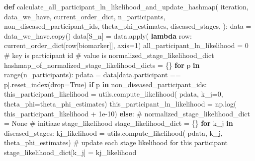 \documentclass[
  letterpaper,
  DIV=11,
  numbers=noendperiod]{scrreprt}
\newenvironment{Shaded}{\begin{snugshade}}{\end{snugshade}}
\newcommand{\BuiltInTok}[1]{\textcolor[rgb]{0.00,0.23,0.31}{#1}}
\newcommand{\CommentTok}[1]{\textcolor[rgb]{0.37,0.37,0.37}{#1}}
\newcommand{\ControlFlowTok}[1]{\textcolor[rgb]{0.00,0.23,0.31}{\textbf{#1}}}
\newcommand{\DecValTok}[1]{\textcolor[rgb]{0.68,0.00,0.00}{#1}}
\newcommand{\FloatTok}[1]{\textcolor[rgb]{0.68,0.00,0.00}{#1}}
\newcommand{\KeywordTok}[1]{\textcolor[rgb]{0.00,0.23,0.31}{\textbf{#1}}}
\newcommand{\NormalTok}[1]{\textcolor[rgb]{0.00,0.23,0.31}{#1}}
\newcommand{\OperatorTok}[1]{\textcolor[rgb]{0.37,0.37,0.37}{#1}}
\newcommand{\StringTok}[1]{\textcolor[rgb]{0.13,0.47,0.30}{#1}}
\newcommand{\VariableTok}[1]{\textcolor[rgb]{0.07,0.07,0.07}{#1}}
\begin{document}
\begin{Shaded}
\begin{Highlighting}[]
\KeywordTok{def}\NormalTok{ calculate\_all\_participant\_ln\_likelihood\_and\_update\_hashmap(}
\NormalTok{        iteration,}
\NormalTok{        data\_we\_have,}
\NormalTok{        current\_order\_dict,}
\NormalTok{        n\_participants,}
\NormalTok{        non\_diseased\_participant\_ids,}
\NormalTok{        theta\_phi\_estimates,}
\NormalTok{        diseased\_stages,}
\NormalTok{):}
\NormalTok{    data }\OperatorTok{=}\NormalTok{ data\_we\_have.copy()}
\NormalTok{    data[}\StringTok{\textquotesingle{}S\_n\textquotesingle{}}\NormalTok{] }\OperatorTok{=}\NormalTok{ data.}\BuiltInTok{apply}\NormalTok{(}
        \KeywordTok{lambda}\NormalTok{ row: current\_order\_dict[row[}\StringTok{\textquotesingle{}biomarker\textquotesingle{}}\NormalTok{]], axis}\OperatorTok{=}\DecValTok{1}\NormalTok{)}
\NormalTok{    all\_participant\_ln\_likelihood }\OperatorTok{=} \DecValTok{0}
    \CommentTok{\# key is participant id}
    \CommentTok{\# value is normalized\_stage\_likelihood\_dict}
\NormalTok{    hashmap\_of\_normalized\_stage\_likelihood\_dicts }\OperatorTok{=}\NormalTok{ \{\}}
    \ControlFlowTok{for}\NormalTok{ p }\KeywordTok{in} \BuiltInTok{range}\NormalTok{(n\_participants):}
\NormalTok{        pdata }\OperatorTok{=}\NormalTok{ data[data.participant }\OperatorTok{==}\NormalTok{ p].reset\_index(drop}\OperatorTok{=}\VariableTok{True}\NormalTok{)}
        \ControlFlowTok{if}\NormalTok{ p }\KeywordTok{in}\NormalTok{ non\_diseased\_participant\_ids:}
\NormalTok{            this\_participant\_likelihood }\OperatorTok{=}\NormalTok{ utils.compute\_likelihood(}
\NormalTok{                pdata, k\_j}\OperatorTok{=}\DecValTok{0}\NormalTok{, theta\_phi}\OperatorTok{=}\NormalTok{theta\_phi\_estimates)}
\NormalTok{            this\_participant\_ln\_likelihood }\OperatorTok{=}\NormalTok{ np.log(}
\NormalTok{                this\_participant\_likelihood }\OperatorTok{+} \FloatTok{1e{-}10}\NormalTok{)}
        \ControlFlowTok{else}\NormalTok{:}
            \CommentTok{\# normalized\_stage\_likelihood\_dict = None}
            \CommentTok{\# initiaze stage\_likelihood}
\NormalTok{            stage\_likelihood\_dict }\OperatorTok{=}\NormalTok{ \{\}}
            \ControlFlowTok{for}\NormalTok{ k\_j }\KeywordTok{in}\NormalTok{ diseased\_stages:}
\NormalTok{                kj\_likelihood }\OperatorTok{=}\NormalTok{ utils.compute\_likelihood(}
\NormalTok{                    pdata, k\_j, theta\_phi\_estimates)}
                \CommentTok{\# update each stage likelihood for this participant}
\NormalTok{                stage\_likelihood\_dict[k\_j] }\OperatorTok{=}\NormalTok{ kj\_likelihood}

\end{Highlighting}
\end{Shaded}
\end{document}
